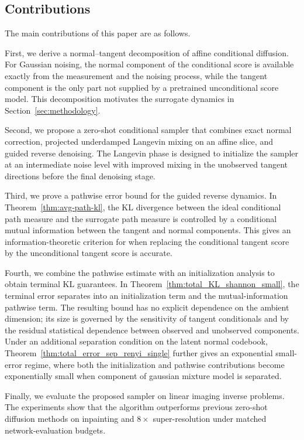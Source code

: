 \documentclass[twoside,11pt]{article}
\numberwithin{equation}{section}
\begin{document}
\subsection{Contributions}

The main contributions of this paper are as follows.

First, we derive a normal--tangent decomposition of affine conditional
diffusion. For Gaussian noising, the normal component of the conditional score
is available exactly from the measurement and the noising process, while the
tangent component is the only part not supplied by a pretrained unconditional
score model. This decomposition motivates the surrogate dynamics in
Section~\ref{sec:methodology}.

Second, we propose a zero-shot conditional sampler that combines exact normal
correction, projected underdamped Langevin mixing on an affine slice, and guided
reverse denoising. The Langevin phase is designed to initialize the sampler at
an intermediate noise level with improved mixing in the unobserved tangent
directions before the final denoising stage.

Third, we prove a pathwise error bound for the guided reverse dynamics. In
Theorem~\ref{thm:avg-path-kl}, the KL divergence between the ideal conditional
path measure and the surrogate path measure is controlled by a conditional
mutual information between the tangent and normal components. This gives an
information-theoretic criterion for when replacing the conditional tangent score
by the unconditional tangent score is accurate.

Fourth, we combine the pathwise estimate with an initialization analysis to
obtain terminal KL guarantees. In
Theorem~\ref{thm:total_KL_shannon_small}, the terminal error separates into an
initialization term and the mutual-information pathwise term. The resulting
bound has no explicit dependence on the ambient dimension; its size is governed
by the sensitivity of tangent conditionals and by the residual statistical
dependence between observed and unobserved components. Under an additional
separation condition on the latent normal codebook,
Theorem~\ref{thm:total_error_sep_renyi_single} further gives an exponential
small-error regime, where both the initialization and pathwise contributions
become exponentially small  when component of gaussian mixture model is separated.

Finally, we evaluate the proposed sampler on linear imaging inverse problems.
The experiments show that the algorithm outperforms previous zero-shot
diffusion methods on inpainting and \(8\times\) super-resolution under matched
network-evaluation budgets.
\end{document}
